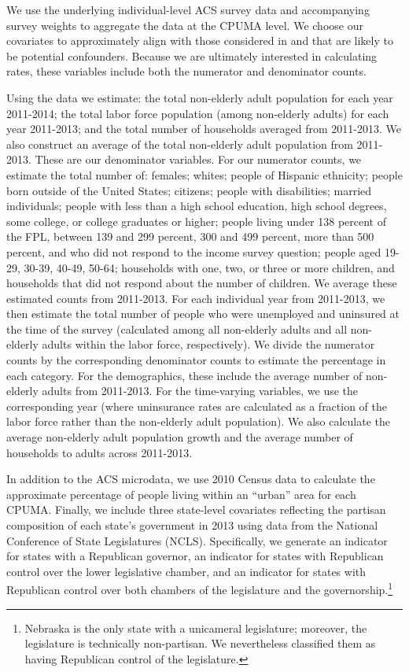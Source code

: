 \documentclass[aoas]{imsart}
\theoremstyle{plain}
\theoremstyle{remark}
\begin{document}
We use the underlying individual-level ACS survey data and accompanying survey weights to aggregate the data at the CPUMA level. We choose our covariates to approximately align with those considered in \cite{courtemanche2017early} and that are likely to be potential confounders. Because we are ultimately interested in calculating rates, these variables include both the numerator and denominator counts. 

Using the data we estimate: the total non-elderly adult population for each year 2011-2014; the total labor force population (among non-elderly adults) for each year 2011-2013; and the total number of households averaged from 2011-2013. We also construct an average of the total non-elderly adult population from 2011-2013. These are our denominator variables. For our numerator counts, we estimate the total number of: females; whites; people of Hispanic ethnicity; people born outside of the United States; citizens; people with disabilities; married individuals; people with less than a high school education, high school degrees, some college, or college graduates or higher; people living under 138 percent of the FPL, between 139 and 299 percent, 300 and 499 percent, more than 500 percent, and who did not respond to the income survey question; people aged 19-29, 30-39, 40-49, 50-64; households with one, two, or three or more children, and households that did not respond about the number of children. We average these estimated counts from 2011-2013. For each individual year from 2011-2013, we then estimate the total number of people who were unemployed and uninsured at the time of the survey (calculated among all non-elderly adults and all non-elderly adults within the labor force, respectively). We divide the numerator counts by the corresponding denominator counts to estimate the percentage in each category. For the demographics, these include the average number of non-elderly adults from 2011-2013. For the time-varying variables, we use the corresponding year (where uninsurance rates are calculated as a fraction of the labor force rather than the non-elderly adult population). We also calculate the average non-elderly adult population growth and the average number of households to adults across 2011-2013. 

In addition to the ACS microdata, we use 2010 Census data to calculate the approximate percentage of people living within an ``urban'' area for each CPUMA. Finally, we include three state-level covariates reflecting the partisan composition of each state's government in 2013 using data from the National Conference of State Legislatures (NCLS). Specifically, we generate an indicator for states with a Republican governor, an indicator for states with Republican control over the lower legislative chamber, and an indicator for states with Republican control over both chambers of the legislature and the governorship.\footnote{Nebraska is the only state with a unicameral legislature; moreover, the legislature is technically non-partisan. We nevertheless classified them as having Republican control of the legislature.} 
\end{document}
